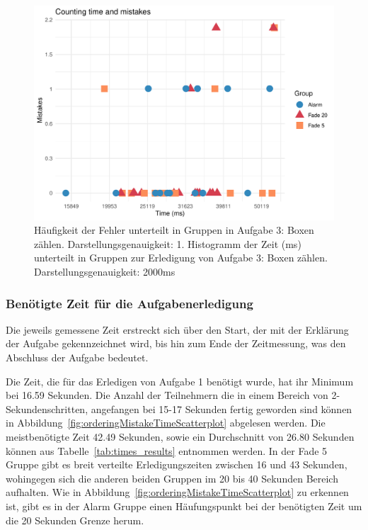 \begin{figure}[H]
	\centering
	\includegraphics[width=\textwidth]{./_StudyResults/countingMisTimeScat}
	\caption{Häufigkeit der Fehler unterteilt in Gruppen in Aufgabe 3: Boxen zählen. Darstellungsgenauigkeit: 1. Histogramm der Zeit (ms) unterteilt in Gruppen zur Erledigung von Aufgabe 3: Boxen zählen. Darstellungsgenauigkeit: 2000ms}
	\label{fig:countingMistakeTimeScatterplot}
\end{figure}

\subsubsection{Benötigte Zeit für die Aufgabenerledigung}

Die jeweils gemessene Zeit erstreckt sich über den Start, der mit der Erklärung der Aufgabe gekennzeichnet wird, bis hin zum Ende der Zeitmessung, was den Abschluss der Aufgabe bedeutet.

Die Zeit, die für das Erledigen von Aufgabe 1 benötigt wurde, hat ihr Minimum bei 16.59 Sekunden. Die Anzahl der Teilnehmern die in einem Bereich von 2-Sekundenschritten, angefangen bei 15-17 Sekunden fertig geworden sind können in Abbildung~\ref{fig:orderingMistakeTimeScatterplot} abgelesen werden. Die meistbenötigte Zeit 42.49 Sekunden, sowie ein Durchschnitt von 26.80 Sekunden können aus Tabelle~\ref{tab:times_results} entnommen werden.
In der Fade 5 Gruppe gibt es breit verteilte Erledigungszeiten zwischen 16 und 43 Sekunden, wohingegen sich die anderen beiden Gruppen im 20 bis 40 Sekunden Bereich aufhalten. Wie in Abbildung~\ref{fig:orderingMistakeTimeScatterplot} zu erkennen ist, gibt es in der Alarm Gruppe einen Häufungspunkt bei der benötigten Zeit um die 20 Sekunden Grenze herum.

